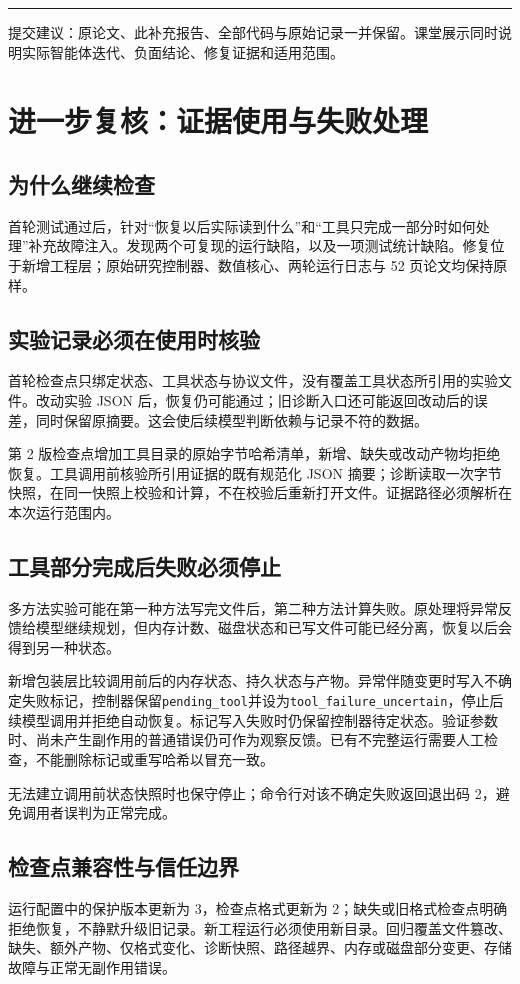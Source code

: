 \documentclass[UTF8,a4paper,zihao=-4,fontset=none]{ctexart}
\newcommand{\code}[1]{{\small\nolinkurl{#1}}}
\begin{document}
\vfill\noindent\textcolor{teal}{\rule{\textwidth}{.6pt}}
{\small\color{muted}提交建议：原论文、此补充报告、全部代码与原始记录一并保留。课堂展示同时说明实际智能体迭代、负面结论、修复证据和适用范围。}
\newpage
\section{进一步复核：证据使用与失败处理}
\label{sec:followup}
\subsection{为什么继续检查}
首轮测试通过后，针对“恢复以后实际读到什么”和“工具只完成一部分时如何处理”补充故障注入。发现两个可复现的运行缺陷，以及一项测试统计缺陷。修复位于新增工程层；原始研究控制器、数值核心、两轮运行日志与 52 页论文均保持原样。

\subsection{实验记录必须在使用时核验}
首轮检查点只绑定状态、工具状态与协议文件，没有覆盖工具状态所引用的实验文件。改动实验 JSON 后，恢复仍可能通过；旧诊断入口还可能返回改动后的误差，同时保留原摘要。这会使后续模型判断依赖与记录不符的数据。

第 2 版检查点增加工具目录的原始字节哈希清单，新增、缺失或改动产物均拒绝恢复。工具调用前核验所引用证据的既有规范化 JSON 摘要；诊断读取一次字节快照，在同一快照上校验和计算，不在校验后重新打开文件。证据路径必须解析在本次运行范围内。

\subsection{工具部分完成后失败必须停止}
多方法实验可能在第一种方法写完文件后，第二种方法计算失败。原处理将异常反馈给模型继续规划，但内存计数、磁盘状态和已写文件可能已经分离，恢复以后会得到另一种状态。

新增包装层比较调用前后的内存状态、持久状态与产物。异常伴随变更时写入不确定失败标记，控制器保留\code{pending_tool}并设为\code{tool_failure_uncertain}，停止后续模型调用并拒绝自动恢复。标记写入失败时仍保留控制器待定状态。验证参数时、尚未产生副作用的普通错误仍可作为观察反馈。已有不完整运行需要人工检查，不能删除标记或重写哈希以冒充一致。

无法建立调用前状态快照时也保守停止；命令行对该不确定失败返回退出码 2，避免调用者误判为正常完成。

\subsection{检查点兼容性与信任边界}
运行配置中的保护版本更新为 3，检查点格式更新为 2；缺失或旧格式检查点明确拒绝恢复，不静默升级旧记录。新工程运行必须使用新目录。回归覆盖文件篡改、缺失、额外产物、仅格式变化、诊断快照、路径越界、内存或磁盘部分变更、存储故障与正常无副作用错误。
\end{document}
